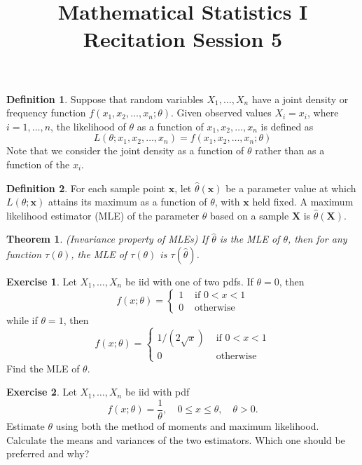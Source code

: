 \documentclass{article}
\title{Mathematical Statistics I\\ Recitation Session 5}
\date{}
\newtheorem*{theorem*}{Theorem}
\theoremstyle{definition}
\newtheorem*{definition*}{Definition}
\newtheorem*{exercise*}{Exercise}
\begin{document}
	\maketitle
	\begin{definition*}
		Suppose that random variables $X_1, \ldots, X_n$ have a joint density or frequency function $f\left(x_1, x_2, \ldots, x_n; \theta\right)$. Given observed values $X_i=x_i$, where $i=1, \ldots, n$, the likelihood of $\theta$ as a function of $x_1, x_2, \ldots, x_n$ is defined as
		$$
		L(\theta;x_1, x_2, \ldots, x_n)=f\left(x_1, x_2, \ldots, x_n; \theta\right)
		$$
		Note that we consider the joint density as a function of $\theta$ rather than as a function of the $x_i$.
	\end{definition*}
		
	\begin{definition*}
		For each sample point $\mathbf{x}$, let $\hat{\theta}(\mathbf{x})$ be a parameter value at which $L(\theta; \mathbf{x})$ attains its maximum as a function of $\theta$, with $\mathbf{x}$ held fixed. A maximum likelihood estimator (MLE) of the parameter $\theta$ based on a sample $\mathbf{X}$ is $\hat{\theta}(\mathbf{X})$.
	\end{definition*}
	
	\begin{theorem*}
		(Invariance property of MLEs) If $\hat{\theta}$ is the MLE of $\theta$, then for any function $\tau(\theta)$, the MLE of $\tau(\theta)$ is $\tau(\hat{\theta})$.
	\end{theorem*}
	
	
	\begin{exercise*}
		Let $X_1, \ldots, X_n$ be iid with one of two pdfs. If $\theta=0$, then
		$$
		f(x;\theta)= \begin{cases}1 & \text { if } 0<x<1 \\ 0 & \text { otherwise }\end{cases}
		$$
		while if $\theta=1$, then
		$$
		f(x;\theta)= \begin{cases}1 /(2 \sqrt{x}) & \text { if } 0<x<1 \\ 0 & \text { otherwise }\end{cases}
		$$
		Find the MLE of $\theta$.
	\end{exercise*}
	 
	\begin{exercise*}
		Let $X_1, \ldots, X_n$ be iid with pdf
		$$
		f(x;\theta)=\frac{1}{\theta}, \quad 0 \leq x \leq \theta, \quad \theta>0 .
		$$
		Estimate $\theta$ using both the method of moments and maximum likelihood. Calculate the means and variances of the two estimators. Which one should be preferred and why?
	\end{exercise*}
	
\end{document}
